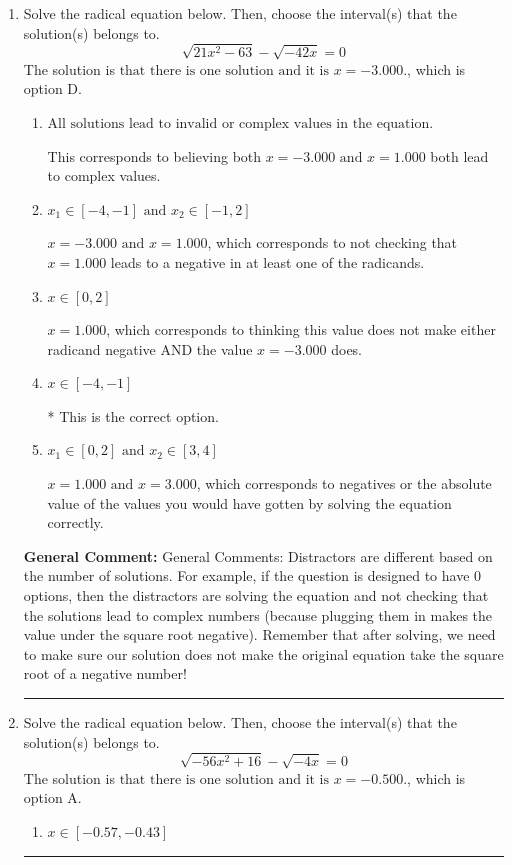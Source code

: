 \documentclass{extbook}[14pt]
\newcommand{\litem}[1]{\item #1

\rule{\textwidth}{0.4pt}}
\begin{document}
\begin{enumerate}\litem{
Solve the radical equation below. Then, choose the interval(s) that the solution(s) belongs to.
\[ \sqrt{21 x^2 - 63} - \sqrt{-42 x} = 0 \]The solution is \( \text{that there is one solution and it is } x = -3.000. \), which is option D.\begin{enumerate}[label=\Alph*.]
\item \( \text{All solutions lead to invalid or complex values in the equation.} \)

This corresponds to believing both $x = -3.000 \text{ and } x = 1.000$ both lead to complex values.
\item \( x_1 \in [-4, -1] \text{ and } x_2 \in [-1,2] \)

$x = -3.000 \text{ and } x = 1.000$, which corresponds to not checking that $x = 1.000$ leads to a negative in at least one of the radicands.
\item \( x \in [0,2] \)

$x = 1.000$, which corresponds to thinking this value does not make either radicand negative AND the value $x = -3.000$ does.
\item \( x \in [-4,-1] \)

* This is the correct option.
\item \( x_1 \in [0, 2] \text{ and } x_2 \in [3,4] \)

$x = 1.000 \text{ and } x = 3.000$, which corresponds to negatives or the absolute value of the values you would have gotten by solving the equation correctly.
\end{enumerate}

\textbf{General Comment:} General Comments: Distractors are different based on the number of solutions. For example, if the question is designed to have 0 options, then the distractors are solving the equation and not checking that the solutions lead to complex numbers (because plugging them in makes the value under the square root negative). Remember that after solving, we need to make sure our solution does not make the original equation take the square root of a negative number!
}
\litem{
Solve the radical equation below. Then, choose the interval(s) that the solution(s) belongs to.
\[ \sqrt{-56 x^2 + 16} - \sqrt{-4 x} = 0 \]The solution is \( \text{that there is one solution and it is } x = -0.500. \), which is option A.\begin{enumerate}[label=\Alph*.]
\item \( x \in [-0.57,-0.43] \)


\end{enumerate}}
\end{enumerate}
\end{document}
